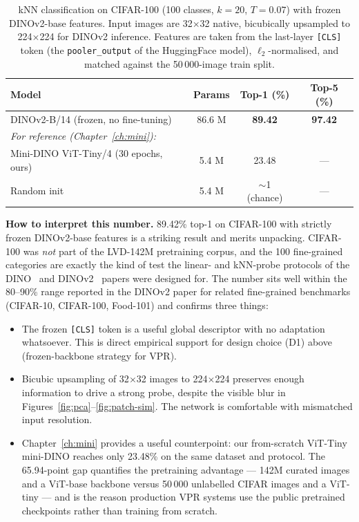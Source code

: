 \documentclass[11pt,a4paper]{article}
\begin{document}
\begin{table}[H]
\centering
\caption{kNN classification on CIFAR-100 (100 classes, $k=20$, $T=0.07$)
with frozen DINOv2-base features. Input images are 32$\times$32 native,
bicubically upsampled to 224$\times$224 for DINOv2 inference. Features
are taken from the last-layer \texttt{[CLS]} token (the
\texttt{pooler\_output} of the HuggingFace model), $\ell_2$-normalised,
and matched against the 50\,000-image train split.}
\label{tab:knn-cifar}
\begin{tabular}{@{}lccc@{}}
\toprule
Model & Params & Top-1 (\%) & Top-5 (\%) \\
\midrule
DINOv2-B/14 (frozen, no fine-tuning) & 86.6 M & \textbf{89.42} & \textbf{97.42} \\
\midrule
\multicolumn{2}{l}{\emph{For reference (Chapter~\ref{ch:mini}):}} & & \\
Mini-DINO ViT-Tiny/4 (30 epochs, ours) & 5.4 M & 23.48 & --- \\
Random init                            & 5.4 M & $\sim$1 (chance) & --- \\
\bottomrule
\end{tabular}
\end{table}

\noindent\textbf{How to interpret this number.}
89.42\% top-1 on CIFAR-100 with strictly frozen DINOv2-base features is a
striking result and merits unpacking. CIFAR-100 was \emph{not} part of
the LVD-142M pretraining corpus, and the 100 fine-grained categories are
exactly the kind of test the linear- and kNN-probe protocols of the
DINO~\citep{caron2021emerging} and DINOv2~\citep{oquab2024dinov2} papers
were designed for. The number sits well within the
80--90\% range reported in the DINOv2 paper for related fine-grained
benchmarks (CIFAR-10, CIFAR-100, Food-101) and confirms three things:

\begin{itemize}[leftmargin=*]
  \item The frozen \texttt{[CLS]} token is a useful global descriptor
  with no adaptation whatsoever. This is direct empirical support for
  design choice (D1) above (frozen-backbone strategy for VPR).
  \item Bicubic upsampling of 32$\times$32 images to 224$\times$224
  preserves enough information to drive a strong probe, despite the
  visible blur in Figures~\ref{fig:pca}--\ref{fig:patch-sim}. The
  network is comfortable with mismatched input resolution.
  \item Chapter~\ref{ch:mini} provides a useful counterpoint:
  our from-scratch ViT-Tiny mini-DINO reaches only 23.48\% on the same
  dataset and protocol. The 65.94-point gap quantifies the
  pretraining advantage --- 142M curated images and a ViT-base backbone
  versus 50\,000 unlabelled CIFAR images and a ViT-tiny --- and is the
  reason production VPR systems use the public pretrained checkpoints
  rather than training from scratch.
\end{itemize}
\end{document}

